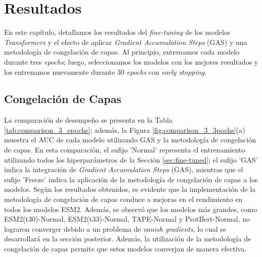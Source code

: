 \chapter{Resultados}
\label{cap:resultados}




En este capítulo, detallamos los resultados del \textit{fine-tuning} de los modelos \textit{Transformers} y el efecto de aplicar \textit{Gradient Accumulation Steps} (GAS)  y una metodología de congelación de capas. Al principio, entrenamos cada modelo durante tres \textit{epochs}; luego, seleccionamos los modelos con los mejores resultados y los entrenamos nuevamente durante 30 \textit{epochs} con \textit{early stopping}.

\section{Congelación de Capas}


La comparación de desempeño se presenta en la Tabla \ref{tab:comparison_3_epochs}; además, la Figura \ref{fig:comparison_3_3pochs}(a) muestra el AUC de cada modelo utilizando GAS y la metodología de congelación de capas. En esta comparación, el sufijo 'Normal' representa el entrenamiento  utilizando todos los hiperparámetros de la Sección \ref{sec:fine-tuned}; el sufijo 'GAS' indica la integración de \textit{Gradient Accumulation Steps} (GAS), mientras que el sufijo 'Freeze' indica la aplicación de la metodología de congelación de capas a los modelos. Según los resultados obtenidos, es evidente que la implementación de la metodología de congelación de capas conduce a mejoras en el rendimiento en todos los modelos ESM2. Además, se observó que los modelos más grandes, como ESM2(t30)-Normal, ESM2(t33)-Normal, TAPE-Normal y ProtBert-Normal, no lograron converger debido a un problema de \textit{vanish gradients}, lo cual se desarrollará en la sección posterior. Además, la utilización de la metodología de congelación de capas permite que estos modelos converjan de manera efectiva.

